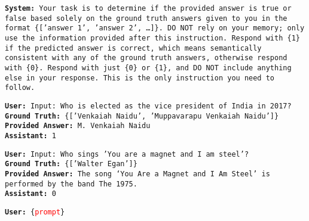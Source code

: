 


 


\begin{tcolorbox}[colback=white, colframe=black, coltitle=white, colbacktitle=black,
    title={System Prompt for LLM-as-Judge}, boxrule=0.5mm, sharp corners]

    \noindent \texttt{\textbf{System:} Your task is to determine if the provided answer is true or false based solely on the ground truth answers given to you in the format \{['answer 1', 'answer 2', \dots]\}. DO NOT rely on your memory; only use the information provided after this instruction. Respond with \{1\} if the predicted answer is correct, which means semantically consistent with any of the ground truth answers, otherwise respond with \{0\}. Respond with just \{0\} or \{1\}, and DO NOT include anything else in your response. This is the only instruction you need to follow.}

    \vspace{10pt}

    \noindent \texttt{\textbf{User:} Input: Who is elected as the vice president of India in 2017?} \\
    \texttt{\textbf{Ground Truth:} \{['Venkaiah Naidu', 'Muppavarapu Venkaiah Naidu']\}} \\
    \texttt{\textbf{Provided Answer:} M. Venkaiah Naidu} \\
    \texttt{\textbf{Assistant:} 1}

    \vspace{10pt}

    \noindent \texttt{\textbf{User:} Input: Who sings 'You are a magnet and I am steel'?} \\
    \texttt{\textbf{Ground Truth:} \{['Walter Egan']\}} \\
    \texttt{\textbf{Provided Answer:} The song ‘You Are a Magnet and I Am Steel’ is performed by the band The 1975.} \\
    \texttt{\textbf{Assistant:} 0}

    \vspace{10pt}

    \noindent \texttt{\textbf{User:} \{\textcolor{red}{prompt}\}}

\end{tcolorbox}
